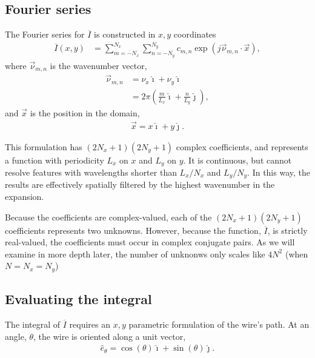 \documentclass{article}
\def\I{\overline{I}}
\def\x{\vec{x}}
\def\vnu{\vec{\nu}_{m,n}}
\def\ui{\hat{\imath}}
\def\uj{\hat{\jmath}}
\begin{document}
\subsection{Fourier series}

The Fourier series for $\I$ is constructed in $x,y$ coordinates
\begin{align}
\I(x,y) &= \sum_{m=-N_x}^{N_x} \sum_{n=-N_y}^{N_y} c_{m,n} \exp\left(j \vnu \cdot \x \right),\label{eqn:Ibar}
\end{align}
where $\vnu$ is the wavenumber vector,
\begin{align}
\vnu &= \nu_x \ui + \nu_y \ui\nonumber\\
 &=2\pi \left( \frac{m}{L_x} \ui + \frac{n}{L_y} \uj \right),
\end{align}
and $\x$ is the position in the domain,
\begin{align}
\x = x \ui + y \uj.
\end{align}

This formulation has $(2N_x+1)(2N_y+1)$ complex coefficients, and represents a function with periodicity $L_x$ on $x$ and $L_y$ on $y$.  It is continuous, but cannot resolve features with wavelengths shorter than $L_x / N_x$ and $L_y / N_y$.  In this way, the results are effectively spatially filtered by the highest wavenumber in the expansion.

Because the coefficients are complex-valued, each of the $(2N_x+1)(2N_y+1)$ coefficients represents two unknowns.  However, because the function, $\I$, is strictly real-valued, the coefficients must occur in complex conjugate pairs.  As we will examine in more depth later, the number of unknonws only scales like $4N^2$ (when $N = N_x = N_y$)

\subsection{Evaluating the integral}

The integral of $\I$ requires an $x,y$ parametric formulation of the wire's path.  At an angle, $\theta$, the wire is oriented along a unit vector,
\begin{align}
\hat{e}_\theta = \cos(\theta) \ui + \sin(\theta) \uj.
\end{align}
\end{document}
